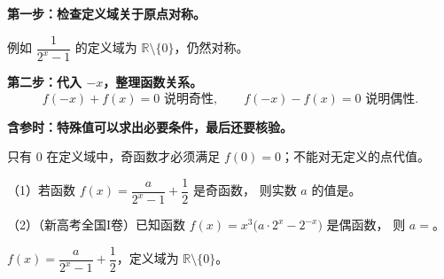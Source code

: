 \begin{frame}[t,label=BmethodP]
  \textbf{第一步：检查定义域关于原点对称。}
  \par 例如 $\dfrac1{2^x-1}$ 的定义域为 $\mathbb R\setminus\{0\}$，仍然对称。
  \pause
  \par\vspace{0.25cm}
  \textbf{第二步：代入 $-x$，整理函数关系。}
  \[
    f(-x)+f(x)=0\text{ 说明奇性},\qquad
    f(-x)-f(x)=0\text{ 说明偶性}.
  \]
  \pause
  \par\vspace{0.25cm}
  \textbf{含参时：特殊值可以求出必要条件，最后还要核验。}
  \par 只有 $0$ 在定义域中，奇函数才必须满足 $f(0)=0$；不能对无定义的点代值。
\end{frame}

\begin{frame}[t,label=B19q]
  （1）若函数 $f(x)=\dfrac a{2^x-1}+\dfrac12$ 是奇函数，
  则实数 $a$ 的值是\underline{\hspace{2cm}}。
  \par\vspace{0.3cm}
  （2）（新高考全国$\mathrm{I}$卷）已知函数
  $f(x)=x^3\bigl(a\cdot2^x-2^{-x}\bigr)$ 是偶函数，
  则 $a=$\underline{\hspace{2cm}}。
  \pause
\end{frame}

\begin{frame}[t,label=B19a]
  $f(x)=\dfrac a{2^x-1}+\dfrac12$，定义域为 $\mathbb R\setminus\{0\}$。
  \pause
\end{frame}

